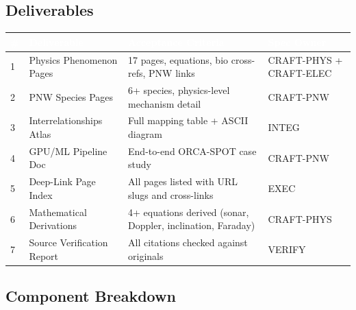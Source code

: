 \documentclass[11pt,letterpaper]{article}
\newcommand{\tableheader}[1]{\textbf{\sffamily\textcolor{white}{#1}}}
\begin{document}
\subsection{Deliverables}

\begin{center}
\begin{tabularx}{\textwidth}{C{0.5cm}L{3.5cm}XL{2.5cm}}
\toprule
{}
\tableheader{\#} & \tableheader{Deliverable} & \tableheader{Acceptance Criteria} & \tableheader{Spec Owner} \\
 & Physics Phenomenon Pages & 17 pages, equations, bio cross-refs, PNW links & CRAFT-PHYS + CRAFT-ELEC \\
2 & PNW Species Pages & 6+ species, physics-level mechanism detail & CRAFT-PNW \\
3 & Interrelationships Atlas & Full mapping table + ASCII diagram & INTEG \\
4 & GPU/ML Pipeline Doc & End-to-end ORCA-SPOT case study & CRAFT-PNW \\
5 & Deep-Link Page Index & All pages listed with URL slugs and cross-links & EXEC \\
6 & Mathematical Derivations & 4+ equations derived (sonar, Doppler, inclination, Faraday) & CRAFT-PHYS \\
7 & Source Verification Report & All citations checked against originals & VERIFY \\
\bottomrule
\end{tabularx}
\end{center}

\subsection{Component Breakdown}
\end{document}
